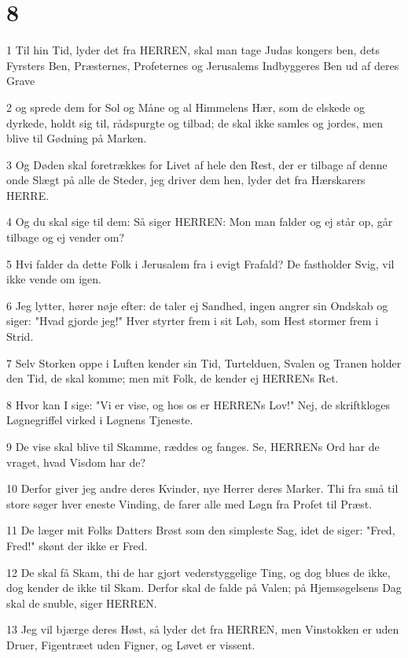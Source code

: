 \chapter{8}

\par 1 Til hin Tid, lyder det fra HERREN, skal man tage Judas kongers ben, dets Fyrsters Ben, Præsternes, Profeternes og Jerusalems Indbyggeres Ben ud af deres Grave
\par 2 og sprede dem for Sol og Måne og al Himmelens Hær, som de elskede og dyrkede, holdt sig til, rådspurgte og tilbad; de skal ikke samles og jordes, men blive til Gødning på Marken.
\par 3 Og Døden skal foretrækkes for Livet af hele den Rest, der er tilbage af denne onde Slægt på alle de Steder, jeg driver dem hen, lyder det fra Hærskarers HERRE.
\par 4 Og du skal sige til dem: Så siger HERREN: Mon man falder og ej står op, går tilbage og ej vender om?
\par 5 Hvi falder da dette Folk i Jerusalem fra i evigt Frafald? De fastholder Svig, vil ikke vende om igen.
\par 6 Jeg lytter, hører nøje efter: de taler ej Sandhed, ingen angrer sin Ondskab og siger: "Hvad gjorde jeg!" Hver styrter frem i sit Løb, som Hest stormer frem i Strid.
\par 7 Selv Storken oppe i Luften kender sin Tid, Turtelduen, Svalen og Tranen holder den Tid, de skal komme; men mit Folk, de kender ej HERRENs Ret.
\par 8 Hvor kan I sige: "Vi er vise, og hos os er HERRENs Lov!" Nej, de skriftkloges Løgnegriffel virked i Løgnens Tjeneste.
\par 9 De vise skal blive til Skamme, ræddes og fanges. Se, HERRENs Ord har de vraget, hvad Visdom har de?
\par 10 Derfor giver jeg andre deres Kvinder, nye Herrer deres Marker. Thi fra små til store søger hver eneste Vinding, de farer alle med Løgn fra Profet til Præst.
\par 11 De læger mit Folks Datters Brøst som den simpleste Sag, idet de siger: "Fred, Fred!" skønt der ikke er Fred.
\par 12 De skal få Skam, thi de har gjort vederstyggelige Ting, og dog blues de ikke, dog kender de ikke til Skam. Derfor skal de falde på Valen; på Hjemsøgelsens Dag skal de snuble, siger HERREN.
\par 13 Jeg vil bjærge deres Høst, så lyder det fra HERREN, men Vinstokken er uden Druer, Figentræet uden Figner, og Løvet er vissent.
